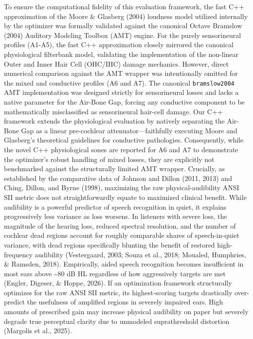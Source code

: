 \documentclass[
  12pt,
]{article}
\begin{document}
To ensure the computational fidelity of this evaluation framework, the
fast C++ approximation of the Moore \& Glasberg (2004) loudness model
utilized internally by the optimizer was formally validated against the
canonical Octave Bramslow (2004) Auditory Modeling Toolbox (AMT) engine.
For the purely sensorineural profiles (A1-A5), the fast C++
approximation closely mirrored the canonical physiological filterbank
model, validating the implementation of the non-linear Outer and Inner
Hair Cell (OHC/IHC) damage mechanics. However, direct numerical
comparison against the AMT wrapper was intentionally omitted for the
mixed and conductive profiles (A6 and A7). The canonical
\texttt{bramslow2004} AMT implementation was designed strictly for
sensorineural losses and lacks a native parameter for the Air-Bone Gap,
forcing any conductive component to be mathematically misclassified as
sensorineural hair-cell damage. Our C++ framework extends the
physiological evaluation by natively separating the Air-Bone Gap as a
linear pre-cochlear attenuator---faithfully executing Moore and
Glasberg's theoretical guidelines for conductive pathologies.
Consequently, while the novel C++ physiological sones are reported for
A6 and A7 to demonstrate the optimizer's robust handling of mixed
losses, they are explicitly not benchmarked against the structurally
limited AMT wrapper. Crucially, as established by the comparative data
of Johnson and Dillon (2011, 2013) and Ching, Dillon, and Byrne (1998),
maximizing the raw physical-audibility ANSI SII metric does not
straightforwardly equate to maximized clinical benefit. While audibility
is a powerful predictor of speech recognition in quiet, it explains
progressively less variance as loss worsens. In listeners with severe
loss, the magnitude of the hearing loss, reduced spectral resolution,
and the number of cochlear dead regions account for roughly comparable
shares of speech-in-quiet variance, with dead regions specifically
blunting the benefit of restored high-frequency audibility (Vestergaard,
2003; Souza et al., 2018; Moualed, Humphries, \& Ramsden, 2018).
Empirically, aided speech recognition becomes insufficient in most ears
above \textasciitilde80 dB HL regardless of how aggressively targets are
met (Engler, Digeser, \& Hoppe, 2026). If an optimization framework
structurally optimizes for the raw ANSI SII metric, its highest-scoring
targets drastically over-predict the usefulness of amplified regions in
severely impaired ears. High amounts of prescribed gain may increase
physical audibility on paper but severely degrade true perceptual
clarity due to unmodeled suprathreshold distortion (Margolis et al.,
2025).
\end{document}
